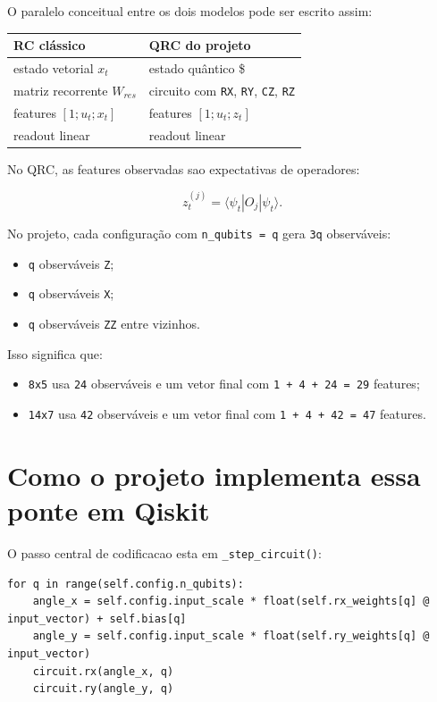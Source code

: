 \documentclass[12pt]{article}
\providecommand{\tightlist}{%
          \setlength{\itemsep}{0pt}\setlength{\parskip}{0pt}}
\begin{document}
O paralelo conceitual entre os dois modelos pode ser escrito assim:

\begin{longtable}[]{@{}ll@{}}
\toprule\noalign{}
RC clássico & QRC do projeto \\
\midrule\noalign{}
\endhead
\bottomrule\noalign{}
\endlastfoot
estado vetorial \(x_t\) & estado quântico \$ \\
matriz recorrente \(W_{res}\) & circuito com \texttt{RX}, \texttt{RY}, \texttt{CZ}, \texttt{RZ} \\
features \([1; u_t; x_t]\) & features \([1; u_t; z_t]\) \\
readout linear & readout linear \\
\end{longtable}

No QRC, as features observadas sao expectativas de operadores:

\[
z_t^{(j)} = \langle \psi_t | O_j | \psi_t \rangle.
\]

No projeto, cada configuração com \texttt{n\_qubits\ =\ q} gera \texttt{3q} observáveis:

\begin{itemize}
\tightlist
\item
  \texttt{q} observáveis \texttt{Z};
\item
  \texttt{q} observáveis \texttt{X};
\item
  \texttt{q} observáveis \texttt{ZZ} entre vizinhos.
\end{itemize}

Isso significa que:

\begin{itemize}
\tightlist
\item
  \texttt{8x5} usa \texttt{24} observáveis e um vetor final com \texttt{1\ +\ 4\ +\ 24\ =\ 29} features;
\item
  \texttt{14x7} usa \texttt{42} observáveis e um vetor final com \texttt{1\ +\ 4\ +\ 42\ =\ 47} features.
\end{itemize}

\section{Como o projeto implementa essa ponte em Qiskit}\label{5-como-o-projeto-implementa-essa-ponte-em-qiskit}

O passo central de codificacao esta em \texttt{\_step\_circuit()}:

\begin{verbatim}
for q in range(self.config.n_qubits):
    angle_x = self.config.input_scale * float(self.rx_weights[q] @ input_vector) + self.bias[q]
    angle_y = self.config.input_scale * float(self.ry_weights[q] @ input_vector)
    circuit.rx(angle_x, q)
    circuit.ry(angle_y, q)
\end{verbatim}
\end{document}
